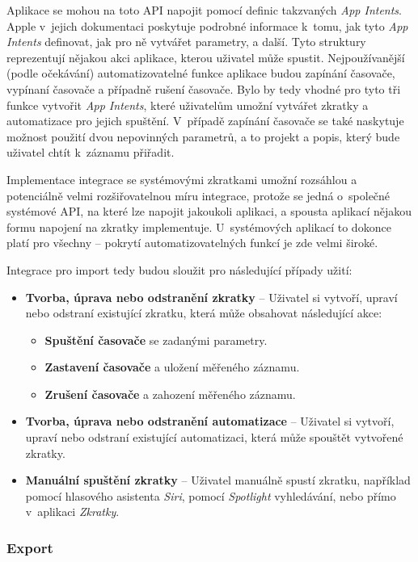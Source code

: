 Aplikace se mohou na toto API napojit pomocí definic takzvaných \emph{App Intents}. Apple v~jejich dokumentaci \cite{ios-app-intents} poskytuje podrobné informace k~tomu, jak tyto \emph{App Intents} definovat, jak pro ně vytvářet parametry, a další. Tyto struktury reprezentují nějakou akci aplikace, kterou uživatel může spustit. Nejpoužívanější (podle očekávání) automatizovatelné funkce aplikace budou zapínání časovače, vypínaní časovače a případně rušení časovače. Bylo by tedy vhodné pro tyto tři funkce vytvořit \emph{App Intents}, které uživatelům umožní vytvářet zkratky a automatizace pro jejich spuštění. V~případě zapínání časovače se také naskytuje možnost použití dvou nepovinných parametrů, a to projekt a popis, který bude uživatel chtít k~záznamu přiřadit.

Implementace integrace se systémovými zkratkami umožní rozsáhlou a potenciálně velmi rozšiřovatelnou míru integrace, protože se jedná o~společné systémové API, na které lze napojit jakoukoli aplikaci, a spousta aplikací nějakou formu napojení na zkratky implementuje. U~systémových aplikací to dokonce platí pro všechny – pokrytí automatizovatelných funkcí je zde velmi široké.

Integrace pro import tedy budou sloužit pro následující případy užití:
\begin{itemize}
\item\textbf{Tvorba, úprava nebo odstranění zkratky} – Uživatel si vytvoří, upraví nebo odstraní existující zkratku, která může obsahovat následující akce:
  \begin{itemize}
  \item\textbf{Spuštění časovače} se zadanými parametry.
  \item\textbf{Zastavení časovače} a uložení měřeného záznamu.
  \item\textbf{Zrušení časovače} a zahození měřeného záznamu.
  \end{itemize}
\item\textbf{Tvorba, úprava nebo odstranění automatizace} – Uživatel si vytvoří, upraví nebo odstraní existující automatizaci, která může spouštět vytvořené zkratky.
\item\textbf{Manuální spuštění zkratky} – Uživatel manuálně spustí zkratku, například pomocí hlasového asistenta \emph{Siri}, pomocí \emph{Spotlight} vyhledávání, nebo přímo v~aplikaci \emph{Zkratky}. 
\end{itemize}

\subsubsection{Export}

